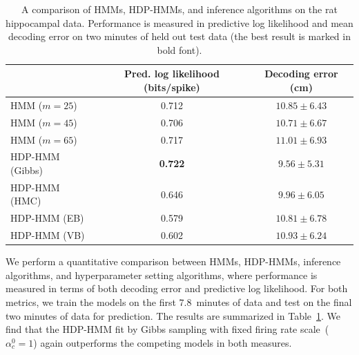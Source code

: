 \begin{table}
  \centering
  \caption[Comparison of models on real hippocampal data]{A comparison
    of HMMs, HDP-HMMs, and inference algorithms on the rat hippocampal
    data. Performance is measured in predictive log likelihood and
    mean decoding error on two minutes of held out test data (the best
    result is marked in bold font).}
  \begin{tabular}{l|cc}
    & Pred. log likelihood (bits/spike) & Decoding error (cm) \\
    \hline 
    HMM ($m=25$)         & 0.712 & $10.85 \pm 6.43$ \\
    HMM ($m=45$)         & 0.706 & $10.71 \pm 6.67$\\
    HMM ($m=65$)         & 0.717 & $11.01 \pm 6.93$\\
    HDP-HMM (Gibbs)    & \bf{0.722} & $\mathbf{9.56 \pm 5.31}$ \\
    HDP-HMM (HMC)      & 0.646 & $9.96 \pm 6.05$\\
    HDP-HMM (EB)       & 0.579 & $10.81 \pm 6.78$\\
    HDP-HMM (VB)       & 0.602 & $10.93 \pm 6.24$\\
    
    \hline
  \end{tabular}
  \label{tab:hipp_err}
\end{table}

We perform a quantitative comparison between HMMs, HDP-HMMs, inference
algorithms, and hyperparameter setting algorithms, where performance
is measured in terms of both decoding error and predictive log
likelihood. For both metrics, we train the models on the first
$7.8$~minutes of data and test on the final two minutes of data for
prediction. The results are summarized in Table~\ref{tab:hipp_err}. We
find that the HDP-HMM fit by Gibbs sampling with fixed firing rate
scale~($\alpha_c^0=1$) again outperforms the competing models in both
measures.

